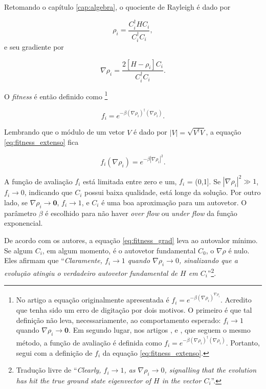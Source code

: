 	Retomando o capítulo \ref{cap:algebra}, o quociente de Rayleigh é dado por
	
	\begin{equation}\label{eq:rho-GA}
		\rho_i = \frac{C_i^\dagger H C_i}{C_i^\dagger C_i},
	\end{equation}
	e seu gradiente por
	
	\begin{equation}\label{eq:grad_rho_metodo}
		\nabla \rho_i = \frac{2[H - \rho_i]C_i}{C_i^\dagger C_i}.
	\end{equation}
		
	O \emph{fitness} é então definido como \footnote{
		No artigo \cite{metodo2004} a equação originalmente apresentada é $f_i = e^{-\beta (\nabla \rho_i)^{\nabla \rho_i}}$. Acredito que tenha sido um erro de digitação por dois motivos. O primeiro é que tal definição não leva, necessariamente, ao comportamento esperado: $f_i \rightarrow 1$ quando $\nabla \rho_i \rightarrow \textbf{0}$. Em segundo lugar, nos artigos \cite{metodo2006},  \cite{metodo2008} e \cite{metodo2009}, que seguem o mesmo método, a função de avaliação é definida como $f_i = e^{-\beta (\nabla \rho_i)^{\dagger} (\nabla \rho_i)}$. Portanto, segui com a definição de $f_i$ da equação \ref{eq:fitness_extenso}.}
	
	\begin{equation}\label{eq:fitness_extenso}
		f_i = e^{-\beta (\nabla \rho_i)^\dagger (\nabla \rho_i)}.
	\end{equation}
	
	Lembrando que o módulo de um vetor $V$ é dado por $|V| = \sqrt{V^{\dagger} V}$, a equação \ref{eq:fitness_extenso} fica
	
	\begin{equation}\label{eq:fitness_grad}
		f_i(\nabla \rho_i) = e^{-\beta |\nabla \rho_i|^2}.
	\end{equation}
			 
	A função de avaliação $f_i$ está limitada entre zero e um, $f_i$ = (0,1]. Se $|\nabla \rho_i|^2 \gg 1$, $f_i \rightarrow 0$, indicando que $C_i$ possui baixa qualidade, está longe da solução. Por outro lado, se $\nabla \rho_i \rightarrow \textbf{0} $, $f_i \rightarrow 1$, e $C_i$ é uma boa aproximação para um autovetor. O parâmetro $\beta$ é escolhido para não haver \emph{over flow} ou \emph{under flow} da função exponencial.
	
	De acordo com os autores, a equação \ref{eq:fitness_grad} leva ao autovalor mínimo. Se algum $C_i$, em algum momento, é o autovetor fundamental $C_0$, o $\nabla \rho$ é nulo. Eles afirmam que ``\textit{Claramente, $f_i \rightarrow 1$ quando $\nabla \rho_i \rightarrow 0$, sinalizando que a evolução atingiu o verdadeiro autovetor fundamental de $H$ em $C_i$}''\footnote{Tradução livre de ``\textit{Clearly, $f_i \rightarrow 1$, as $\nabla \rho_i \rightarrow 0$, signalling that the evolution has hit the true ground state eigenvector of $H$ in the vector $C_i$}''.}. 
	
